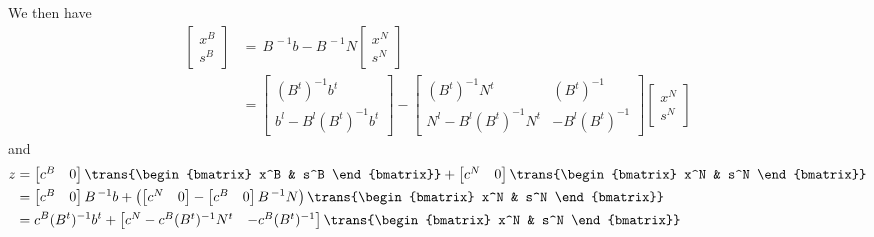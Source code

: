We then have
\begin{equation}
\begin{split}
\begin{bmatrix} x^B \\ s^B \end{bmatrix} & = \,
B^{\,-1}b - B^{\,-1} N \begin{bmatrix} x^N \\ s^N \end{bmatrix} \\
%
& = \begin{bmatrix} (B^t)^{-1} b^t \\ b^l - B^l(B^t)^{-1} b^t \end{bmatrix} -
    \begin{bmatrix}
      (B^t)^{-1} N^t & (B^t)^{-1} \\
      N^l - B^l(B^t)^{-1}N^t & -B^l(B^t)^{-1}
    \end{bmatrix}
    \begin{bmatrix} x^N \\ s^N \end{bmatrix}
\end{split} \label{Eqn:PrimalBasicVars}
\end{equation}
and
\begin{equation}
\begin{split}
z & = \begin{bmatrix} c^B & 0 \end{bmatrix}
      \trans{\begin{bmatrix} x^B & s^B \end{bmatrix}} +
      \begin{bmatrix} c^N & 0 \end{bmatrix}
      \trans{\begin{bmatrix} x^N & s^N \end{bmatrix}} \\
  & = \begin{bmatrix} c^B & 0 \end{bmatrix}B^{\,-1}b +
      \left(
        \begin{bmatrix} c^N & 0 \end{bmatrix} -
        \begin{bmatrix} c^B & 0 \end{bmatrix} B^{\,-1} N
      \right)
      \trans{\begin{bmatrix} x^N & s^N \end{bmatrix}} \\
  & = c^B (B^t)^{-1} b^t +
      \begin{bmatrix} c^N - c^B (B^t)^{-1} N^t & -c^B(B^t)^{-1} \end{bmatrix}
      \trans{\begin{bmatrix} x^N & s^N \end{bmatrix}}
\end{split} \label{Eqn:PrimalObj}
\end{equation}
